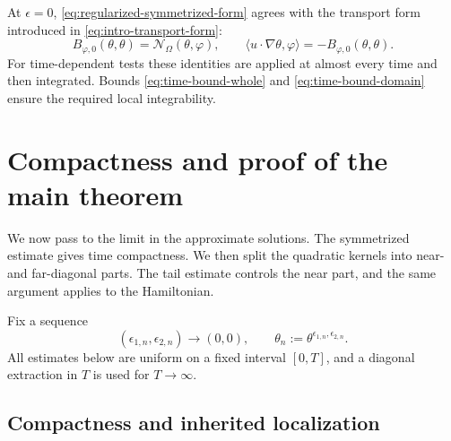 \documentclass[11pt,reqno]{amsproc}
\newcommand{\Om}{\Omega}
\begin{document}
At $\epsilon=0$, \eqref{eq:regularized-symmetrized-form} agrees with the
transport form introduced in \eqref{eq:intro-transport-form}:
\[
  B_{\varphi,0}(\theta,\theta)=\mathcal N_\Om(\theta,\varphi),
  \qquad
  \langle u\cdot\nabla\theta,\varphi\rangle
  =-B_{\varphi,0}(\theta,\theta).
\]
For time-dependent tests these identities are applied at almost every time
and then integrated.  Bounds \eqref{eq:time-bound-whole} and
\eqref{eq:time-bound-domain} ensure the required local integrability.

\section{Compactness and proof of the main theorem}
\label{sec:compactness-proof}

We now pass to the limit in the approximate solutions.  The symmetrized
estimate gives time compactness.  We then split the quadratic kernels into
near- and far-diagonal parts.  The tail estimate controls the near part, and
the same argument applies to the Hamiltonian.

Fix a sequence
\[
  (\epsilon_{1,n},\epsilon_{2,n})\longrightarrow(0,0),
  \qquad
  \theta_n:=\theta^{\epsilon_{1,n},\epsilon_{2,n}}.
\]
All estimates below are uniform on a fixed interval $[0,T]$, and a diagonal
extraction in $T$ is used for $T\to\infty$.

\subsection{Compactness and inherited localization}
\end{document}
